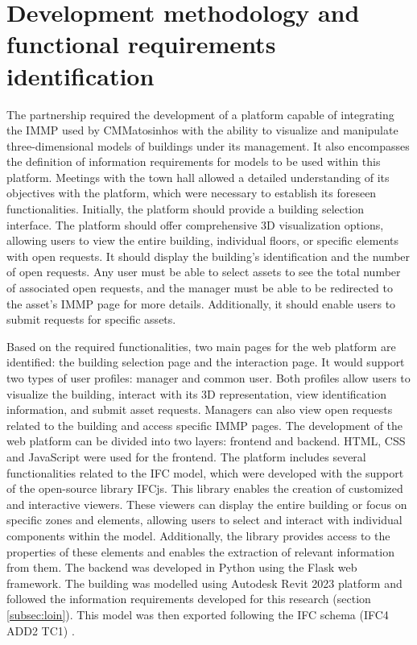 \documentclass[a4paper, 10pt, twocolumn, twoside]{article}
\begin{document}
\section{Development methodology and functional requirements identification}
\label{sec:methodology}

The partnership required the development of a platform capable of integrating the IMMP used by CMMatosinhos with the ability to visualize and manipulate three-dimensional models of buildings under its management. It also encompasses the definition of information requirements for models to be used within this platform. Meetings with the town hall allowed a detailed understanding of its objectives with the platform, which were necessary to establish its foreseen functionalities. Initially, the platform should provide a building selection interface. The platform should offer comprehensive 3D visualization options, allowing users to view the entire building, individual floors, or specific elements with open requests. It should display the building's identification and the number of open requests. Any user must be able to select assets to see the total number of associated open requests, and the manager must be able to be redirected to the asset's IMMP page for more details. Additionally, it should enable users to submit requests for specific assets.

Based on the required functionalities, two main pages for the web platform are identified: the building selection page and the interaction page. It would support two types of user profiles: manager and common user. Both profiles allow users to visualize the building, interact with its 3D representation, view identification information, and submit asset requests. Managers can also view open requests related to the building and access specific IMMP pages. The development of the web platform can be divided into two layers: frontend and backend. HTML, CSS and JavaScript were used for the frontend. The platform includes several functionalities related to the IFC model, which were developed with the support of the open-source library IFCjs. This library enables the creation of customized and interactive viewers. These viewers can display the entire building or focus on specific zones and elements, allowing users to select and interact with individual components within the model. Additionally, the library provides access to the properties of these elements and enables the extraction of relevant information from them. The backend was developed in Python using the Flask web framework. The building was modelled using Autodesk Revit 2023 platform and followed the information requirements developed for this research (section \ref{subsec:loin}). This model was then exported following the IFC schema (IFC4 ADD2 TC1) \cite{BuildingSMARTa}.
\end{document}
